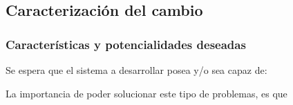 \subsection{Caracterización del cambio}

\subsubsection{Características y potencialidades deseadas}
	Se espera que el sistema a desarrollar posea y/o sea capaz de:
%				
%
%
%
%

La importancia de poder solucionar este tipo de problemas,
es que 

